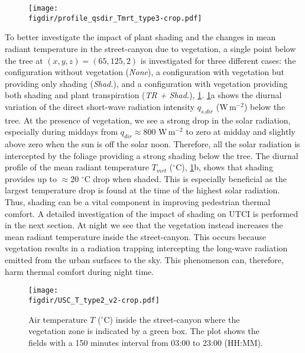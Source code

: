 \begin{figure}[p]
	\centering
	\texttt{[image: \\figdir/profile\_qsdir\_Tmrt\_type3-crop.pdf]}
	\caption{}
	\label{fig:profile_qsdir_Tmrt}
\end{figure}

To better investigate the impact of plant shading and the changes in mean radiant temperature in the street-canyon due to vegetation, a single point below the tree at $(x,y,z) = (65, 125, 2)$ is investigated for three different cases: the configuration without vegetation (\textit{None}), a configuration with vegetation but providing only shading (\textit{Shad.}), and a configuration with vegetation providing both shading and plant transpiration (\textit{TR + Shad.}), \cref{fig:profile_qsdir_Tmrt}. \cref{fig:profile_qsdir_Tmrt}a shows the diurnal variation of the direct short-wave radiation intensity $q_{\textit{s,dir}}$ (W\,m$^{-2}$) below the tree. At the presence of vegetation, we see a strong drop in the solar radiation, especially during middays from $q_{dir} \approx 800$ W\,m$^{-2}$ to zero at midday and slightly above zero when the sun is off the solar noon. Therefore, all the solar radiation is intercepted by the foliage providing a strong shading below the tree. The diurnal profile of the mean radiant temperature $T_{\textit{mrt}}$  ($^{\circ}$C), \cref{fig:profile_qsdir_Tmrt}b, shows that shading provides up to $\approx 20$ $^{\circ}$C drop when shaded. This is especially beneficial as the largest temperature drop is found at the time of the highest solar radiation. Thus, shading can be a vital component in improving pedestrian thermal comfort. A detailed investigation of the impact of shading on UTCI is performed in the next section. At night we see that the vegetation instead increases the mean radiant temperature inside the street-canyon. This occurs because vegetation results in a radiation trapping intercepting the long-wave radiation emitted from the urban surfaces to the sky. This phenomenon can, therefore, harm thermal comfort during night time. 

\begin{sidewaysfigure}[p]
	\centering
	\texttt{[image: \\figdir/USC\_T\_type2\_v2-crop.pdf]}
	\caption{Air temperature $T$ ($^{\circ}$C) inside the street-canyon where the vegetation zone is indicated by a green box. The plot shows the fields with a 150 minutes interval from 03:00 to 23:00 (HH:MM).}
	\label{fig:USC_T}
\end{sidewaysfigure}

